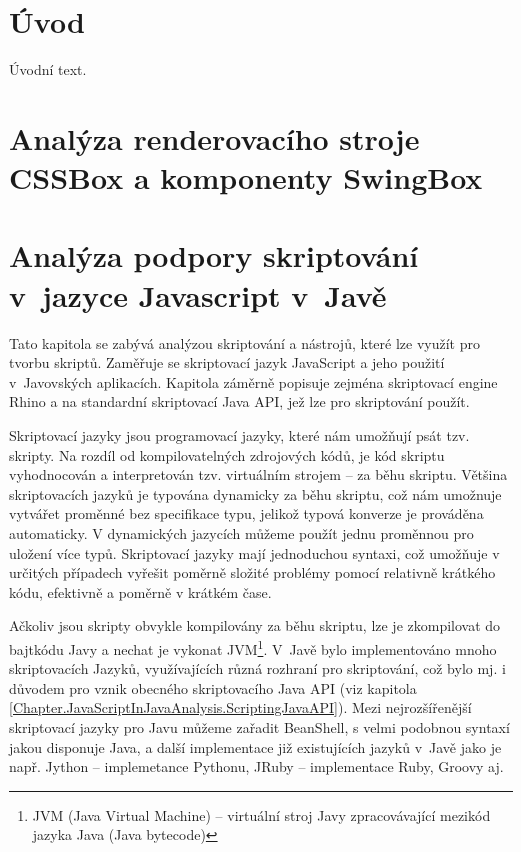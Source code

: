 
\chapter{Úvod}
\label{Chapter.Introducion}
Úvodní text.

\chapter{Analýza renderovacího stroje CSSBox a komponenty SwingBox}
\label{Chapter.CSSBoxAndSwingBox}

\chapter{Analýza podpory skriptování v~jazyce Javascript v~Javě}
\label{Chapter.JavaScriptInJavaAnalysis}

Tato kapitola se zabývá analýzou skriptování a nástrojů, které lze využít pro tvorbu skriptů. Zaměřuje se skriptovací jazyk JavaScript a jeho použití v~Javovských aplikacích. Kapitola záměrně popisuje zejména skriptovací engine Rhino a na standardní skriptovací Java API, jež lze pro skriptování použít.

Skriptovací jazyky jsou programovací jazyky, které nám umožňují psát tzv. skripty. Na rozdíl od kompilovatelných zdrojových kódů, je kód skriptu vyhodnocován a interpretován tzv. virtuálním strojem -- za běhu skriptu. Většina skriptovacích jazyků je typována dynamicky za běhu skriptu, což nám umožnuje vytvářet proměnné bez specifikace typu, jelikož typová konverze je prováděna automaticky. V dynamických jazycích můžeme použít jednu proměnnou pro uložení více typů. Skriptovací jazyky mají jednoduchou syntaxi, což umožňuje v určitých případech vyřešit poměrně složité problémy pomocí relativně krátkého kódu, efektivně a poměrně v krátkém čase.

Ačkoliv jsou skripty obvykle kompilovány za běhu skriptu, lze je zkompilovat do bajtkódu Javy a nechat je vykonat JVM\footnote{JVM  (Java Virtual Machine) -- virtuální stroj Javy zpracovávající mezikód jazyka Java (Java bytecode)}. V~Javě bylo implementováno mnoho skriptovacích Jazyků, využívajících různá rozhraní pro skriptování, což bylo mj. i důvodem pro vznik obecného skriptovacího Java API (viz kapitola \ref{Chapter.JavaScriptInJavaAnalysis.ScriptingJavaAPI}). Mezi nejrozšířenější skriptovací jazyky pro Javu můžeme zařadit BeanShell, s velmi podobnou syntaxí jakou disponuje Java, a další implementace již existujících jazyků v~Javě jako je např. Jython -- implemetance Pythonu,  JRuby -- implementace Ruby, Groovy aj.

